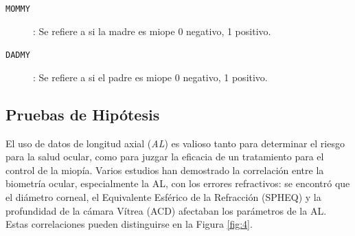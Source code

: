 \documentclass[a4paper,10pt,twocolumn]{article}
\begin{document}
\begin{description}
  	\item [\texttt{MOMMY}]: Se refiere a si la madre es miope 0 negativo, 1 positivo.
  	\item [\texttt{DADMY}]: Se refiere a si el padre es miope 0 negativo, 1 positivo.
  	
  \end{description}
  
  

  

%		
%		
%
%		
\subsection{Pruebas de Hipótesis}\label{sub:hiptesting}
	El uso de datos de longitud axial (\emph{AL}) es valioso tanto para determinar el riesgo para la salud ocular, como para juzgar la eficacia de un tratamiento para el control de la miopía. Varios estudios han demostrado la correlación entre la biometría ocular, especialmente la AL, con los errores refractivos: se encontró que el diámetro corneal, el Equivalente Esférico de la Refracción (SPHEQ) y la profundidad de la cámara Vítrea (ACD) afectaban los parámetros de la AL. Estas correlaciones pueden distinguirse en la Figura \ref{fig:4}.
	
\end{document}
